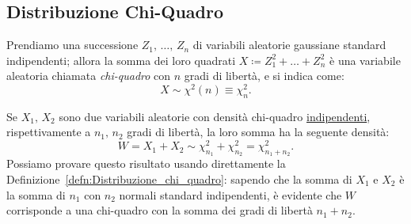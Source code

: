         \subsection{Distribuzione Chi-Quadro}
            \begin{defn}\label{defn:Distribuzione_chi_quadro}
                Prendiamo una successione $Z_1,\, \ldots,\, Z_{n}$ di variabili aleatorie gaussiane standard indipendenti; allora la somma dei loro quadrati $X \coloneqq Z^2_1 + \ldots + Z^2_{n}$ è una variabile aleatoria chiamata \emph{chi-quadro} con $n$ gradi di libertà, e si indica come: \[
                    X \sim \chi^2(n) \equiv \chi^2_n
                .\]
            \end{defn}
            \begin{obsv}[Riproducibilità]
                Se $X_1,\,X_2$ sono due variabili aleatorie con densità chi-quadro \underline{indipendenti}, rispettivamente a $n_1,\,n_2$ gradi di libertà, la loro somma ha la seguente densità: \[
                    W = X_1 + X_2 \sim \chi^2_{n_1} + \chi^2_{n_2} = \chi^2_{n_1+n_2}
                .\] Possiamo provare questo risultato usando direttamente la Definizione~\ref{defn:Distribuzione_chi_quadro}: sapendo che la somma di $X_1$ e $X_2$ è la somma di $n_1$ con $n_2$ normali standard indipendenti, è evidente che $W$ corrisponde a una chi-quadro con la somma dei gradi di libertà $n_1+n_2$.
            \end{obsv}
